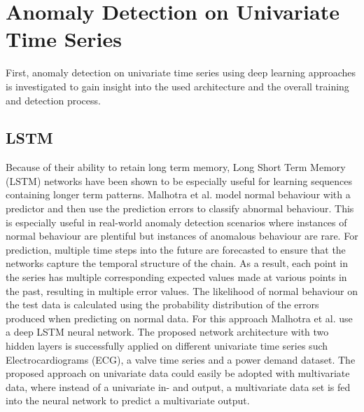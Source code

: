 %
%
%
%

\section{Anomaly Detection on Univariate Time Series}

First, anomaly detection on univariate time series using deep learning approaches is investigated to gain insight into the used architecture and the overall training and detection process. 

\subsection{LSTM}

Because of their ability to retain long term memory, Long Short Term Memory (LSTM) networks have been shown to be especially useful for learning sequences containing longer term patterns. Malhotra et al. \parencite*{Malhotra2015} model normal behaviour with a predictor and then use the prediction errors to classify abnormal behaviour. This is especially useful in real-world anomaly detection scenarios where instances of normal behaviour are plentiful but instances of anomalous behaviour are rare. For prediction, multiple time steps into the future are forecasted to ensure that the networks capture the temporal structure of the chain. As a result, each point in the series has multiple corresponding expected values made at various points in the past, resulting in multiple error values. The likelihood of normal behaviour on the test data is calculated using the probability distribution of the errors produced when predicting on normal data. For this approach Malhotra et al. use a deep LSTM neural network. The proposed network architecture with two hidden layers is successfully applied on different univariate time series such Electrocardiograms (ECG), a valve time series and a power demand dataset. The proposed approach on univariate data could easily be adopted with multivariate data, where instead of a univariate in- and output, a multivariate data set is fed into the neural network to predict a multivariate output. 

